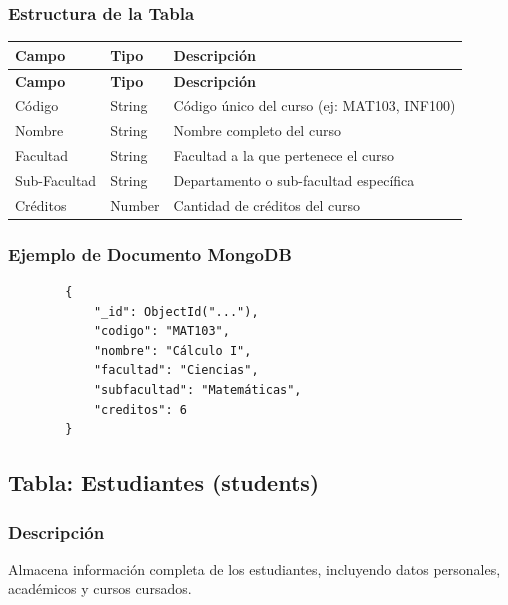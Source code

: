 \documentclass[12pt,a4paper]{article}
\begin{document}
	\subsubsection{Estructura de la Tabla}
	
	\begin{longtable}{|p{3cm}|p{3cm}|p{8cm}|}
		\hline
		\textbf{Campo} & \textbf{Tipo} & \textbf{Descripción} \\
		\hline
		\endfirsthead
		
		\hline
		\textbf{Campo} & \textbf{Tipo} & \textbf{Descripción} \\
		\hline
		\endhead
		
		\hline
		\endfoot
		
		Código & String & Código único del curso (ej: MAT103, INF100) \\
		\hline
		Nombre & String & Nombre completo del curso \\
		\hline
		Facultad & String & Facultad a la que pertenece el curso \\
		\hline
		Sub-Facultad & String & Departamento o sub-facultad específica \\
		\hline
		Créditos & Number & Cantidad de créditos del curso \\
		\hline
	\end{longtable}
	
	\subsubsection{Ejemplo de Documento MongoDB}
	
	\begin{verbatim}
		{
			"_id": ObjectId("..."),
			"codigo": "MAT103",
			"nombre": "Cálculo I",
			"facultad": "Ciencias",
			"subfacultad": "Matemáticas",
			"creditos": 6
		}
	\end{verbatim}
	
	\subsection{Tabla: Estudiantes (students)}
	
	\subsubsection{Descripción}
	Almacena información completa de los estudiantes, incluyendo datos personales, académicos y cursos cursados.
	
\end{document}
